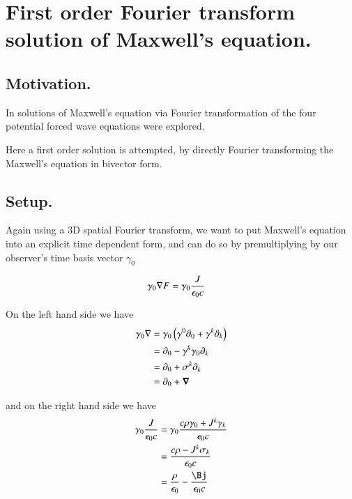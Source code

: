 \chapter{First order Fourier transform solution of Maxwell's equation.}\label{chap:PJfirstOrderMaxwell}
\date{Jan 31, 2009.  firstorderFourierMaxwell.tex}

\section{Motivation. }

In  solutions of Maxwell's equation
via Fourier transformation of the four potential forced wave equations were
explored.

Here a first order solution is attempted, by directly Fourier transforming
the Maxwell's equation in bivector form.

\section{Setup. }

Again using a 3D spatial Fourier transform, we want to put Maxwell's equation into an explicit time dependent form, and can do so by
premultiplying by our observer's time basis vector $\gamma_0$

\begin{align*}
\gamma_0 \nabla F &= \gamma_0 \frac{J }{\epsilon_0 c}
\end{align*}

On the left hand side we have
\begin{align*}
\gamma_0 \nabla 
&= \gamma_0 \left( \gamma^0 \partial_0 + \gamma^k \partial_k \right) \\
&= \partial_0 - \gamma^k \gamma_0 \partial_k \\
&= \partial_0 + \sigma^k \partial_k \\
&= \partial_0 + \boldsymbol{\nabla} \\
\end{align*}

and on the right hand side we have
\begin{align*}
\gamma_0 \frac{J }{\epsilon_0 c}
&= \gamma_0 \frac{c \rho \gamma_0 + J^k \gamma_k }{\epsilon_0 c} \\
&= \frac{c \rho - J^k \sigma_k }{\epsilon_0 c} \\
&= \frac{\rho}{\epsilon_0} - \frac{\Bj}{\epsilon_0 c} \\
\end{align*}

